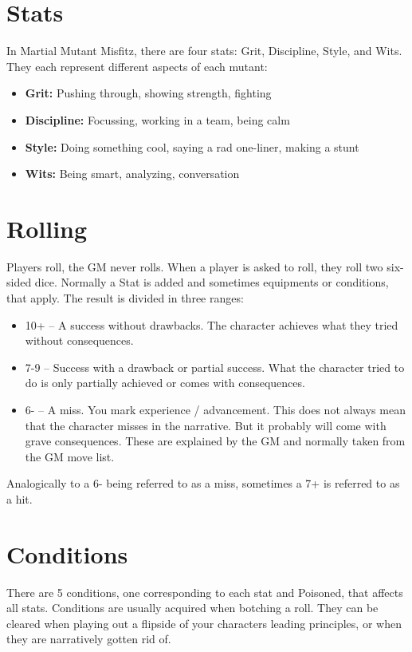 \documentclass{book}
\begin{document}
\section*{Stats}
In Martial Mutant Misfitz, there are four stats: Grit, Discipline, Style, and Wits. They each represent different aspects of each mutant:
\begin{itemize}
    \item \textbf{Grit:} Pushing through, showing strength, fighting
    \item \textbf{Discipline:} Focussing, working in a team, being calm
    \item \textbf{Style:} Doing something cool, saying a rad one-liner, making a stunt
    \item \textbf{Wits:} Being smart, analyzing, conversation
\end{itemize}


\section*{Rolling}
Players roll, the GM never rolls.
When a player is asked to roll, they roll two six-sided dice.
Normally a Stat is added and sometimes equipments or conditions, that apply.
The result is divided in three ranges:
\begin{itemize}
    \item 10+ -- A success without drawbacks. The character achieves what they tried without consequences.
    \item 7-9 -- Success with a drawback or partial success. What the character tried to do is only partially achieved or comes with consequences.
    \item 6- -- A miss. You mark experience / advancement. This does not always mean that the character misses in the narrative. But it probably will come with grave consequences. These are explained by the GM and normally taken from the GM move list.
\end{itemize}
Analogically to a 6- being referred to as a miss, sometimes a 7+ is referred to as a hit.


\section*{Conditions}
There are 5 conditions, one corresponding to each stat and Poisoned, that affects all stats.
Conditions are usually acquired when botching a roll.
They can be cleared when playing out a flipside of your characters leading principles, or when they are narratively gotten rid of.
\end{document}
